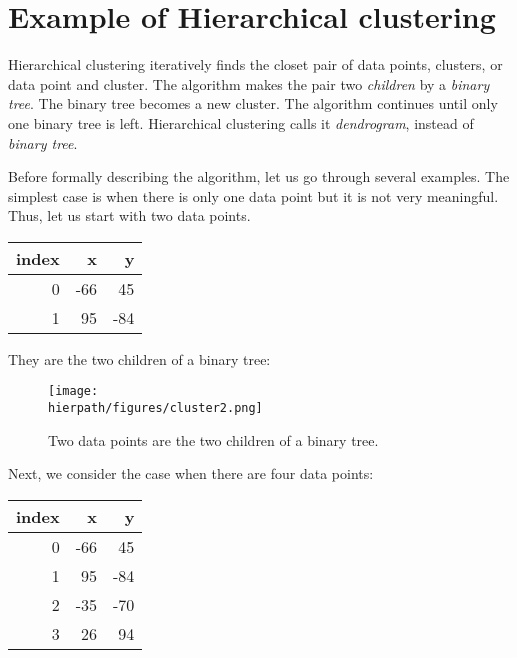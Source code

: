 
\section{Example of 
Hierarchical clustering}

Hierarchical clustering iteratively finds the closet pair of data
points, clusters, or data point and cluster. The algorithm makes the
pair two {\it children} by a {\it binary tree}.  The binary tree
becomes a new cluster.  The algorithm continues until only one binary
tree is left.  Hierarchical clustering calls it {\it dendrogram}, instead
of {\it binary tree}.

Before formally describing the algorithm, let us go through several
examples.  The simplest case is when there is only one data point but
it is not very meaningful. Thus, let us start with two data points.

\begin{table}[h]
\begin{tt}
\begin{tabular}{|r|rr|} \hline
{\bf index} &  {\bf x} & {\bf y} \\ \hline
0 &  -66  &  45 \\
1 & 95  &  -84 \\ \hline
\end{tabular}
\end{tt}
\end{table}

They are the two children of a binary tree:

\begin{figure}[h] \centering
{\texttt{[image: \\hierpath/figures/cluster2.png]}}
\caption{Two data points are the two children of a binary tree. }
\end{figure}

Next, we consider the case when there are four data points:

\begin{table}[h]
\begin{tt}
\begin{tabular}{|r|rr|} \hline
{\bf index} &  {\bf x} & {\bf y} \\ \hline
0 &  -66  &  45 \\
1 & 95  &  -84 \\
2 & -35  &  -70 \\
3 & 26  &  94 \\ \hline
\end{tabular}
\end{tt}
\end{table}


